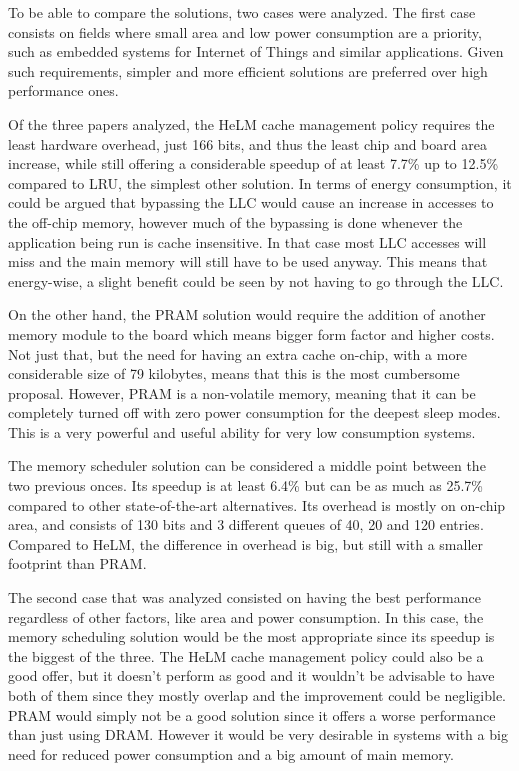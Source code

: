 \documentclass[10pt,journal,compsoc]{IEEEtran}
\begin{document}
To be able to compare the solutions, two cases were analyzed. The first case consists on fields where small area and low power consumption are a priority, such as embedded systems for Internet of Things and similar applications. Given such requirements, simpler and more efficient solutions are preferred over high performance ones.

Of the three papers analyzed, the HeLM cache management policy requires the least hardware overhead, just 166 bits, and thus the least chip and board area increase, while still offering a considerable speedup of at least 7.7\% up to 12.5\% compared to LRU, the simplest other solution. In terms of energy consumption, it could be argued that bypassing the LLC would cause an increase in accesses to the off-chip memory, however much of the bypassing is done whenever the application being run is cache insensitive. In that case most LLC accesses will miss and the main memory will still have to be used anyway. This means that energy-wise, a slight benefit could be seen by not having to go through the LLC.

On the other hand, the PRAM solution would require the addition of another memory module to the board which means bigger form factor and higher costs. Not just that, but the need for having an extra cache on-chip, with a more considerable size of 79 kilobytes, means that this is the most cumbersome proposal. However, PRAM is a non-volatile memory, meaning that it can be completely turned off with zero power consumption for the deepest sleep modes. This is a very powerful and useful ability for very low consumption systems.

The memory scheduler solution can be considered a middle point between the two previous onces. Its speedup is at least 6.4\% but can be as much as 25.7\% compared to other state-of-the-art alternatives. Its overhead is mostly on on-chip area, and consists of 130 bits and 3 different queues of 40, 20 and 120 entries. Compared to HeLM, the difference in overhead is big, but still with a smaller footprint than PRAM.

The second case that was analyzed consisted on having the best performance regardless of other factors, like area and power consumption. In this case, the memory scheduling solution would be the most appropriate since its speedup is the biggest of the three. The HeLM cache management policy could also be a good offer, but it doesn't perform as good and it wouldn't be advisable to have both of them since they mostly overlap and the improvement could be negligible. PRAM would simply not be a good solution since it offers a worse performance than just using DRAM. However it would be very desirable in systems with a big need for reduced power consumption and a big amount of main memory.
\end{document}
